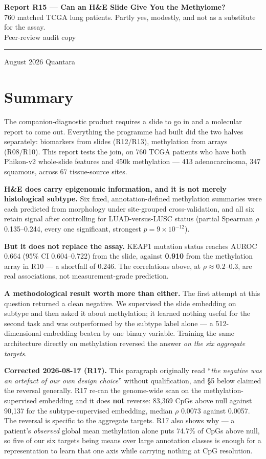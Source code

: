 \documentclass[11pt,a4paper]{article}
\begin{document}
\thispagestyle{empty}
\noindent
{\large\bfseries\color{qnavy} Report R15 --- Can an H\&E Slide Give You the Methylome?}\\[2pt]
{\color{qgrey}760 matched TCGA lung patients. Partly yes, modestly, and not as a substitute for
the assay.}\\[6pt]
{\color{qgrey}Peer-review audit copy}\\[4pt]
{\color{qgrey}\rule{\textwidth}{0.4pt}}

\medskip
{} August 2026 \quad\textbullet\quad Quantara

\section*{Summary}

The companion-diagnostic product requires a slide to go in and a molecular report to come out.
Everything the programme had built did the two halves separately: biomarkers from slides
(R12/R13), methylation from arrays (R08/R10). This report tests the join, on 760 TCGA patients who
have both Phikon-v2 whole-slide features and 450k methylation --- 413 adenocarcinoma, 347
squamous, across 67 tissue-source sites.

\textbf{H\&E does carry epigenomic information, and it is not merely histological subtype.} Six
fixed, annotation-defined methylation summaries were each predicted from morphology under
site-grouped cross-validation, and all six retain signal after controlling for LUAD-versus-LUSC
status (partial Spearman $\rho$ 0.135--0.244, every one significant, strongest
$p = 9\times10^{-12}$).

\textbf{But it does not replace the assay.} KEAP1 mutation status reaches AUROC 0.664
(95\% CI 0.604--0.722) from the slide, against \textbf{0.910} from the methylation array in R10
--- a shortfall of 0.246. The correlations above, at $\rho \approx 0.2$--0.3, are real
associations, not measurement-grade prediction.

\textbf{A methodological result worth more than either.} The first attempt at this question
returned a clean negative. We supervised the slide embedding on subtype and then asked it about
methylation; it learned nothing useful for the second task and was outperformed by the subtype
label alone --- a 512-dimensional embedding beaten by one binary variable. Training the same
architecture directly on methylation reversed the answer \emph{on the six aggregate targets}.

\textcolor{qred}{\textbf{Corrected 2026-08-17 (R17).}} This paragraph originally read ``\emph{the
negative was an artefact of our own design choice}'' without qualification, and \S5 below claimed
the reversal generally. R17 re-ran the genome-wide scan on the methylation-supervised embedding
and it does \textbf{not} reverse: 83{,}369 CpGs above null against 90{,}137 for the
subtype-supervised embedding, median $\rho$ 0.0073 against 0.0057. The reversal is specific to the
aggregate targets. R17 also shows why --- a patient's \emph{observed} global mean methylation
alone puts 74.7\% of CpGs above null, so five of our six targets being means over large
annotation classes is enough for a representation to learn that one axis while carrying nothing at
CpG resolution.
\end{document}
